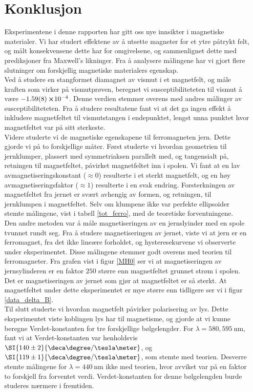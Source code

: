 \documentclass[%
 reprint,
nofootinbib,
aps,
]{revtex4-1}
\begin{document}
\section{Konklusjon}
Eksperimentene i denne rapporten har gitt oss nye innsikter i magnetiske materialer. Vi har studert effektene av å utsette magneter for et ytre påtrykt felt, og målt konsekvensene dette har for omgivelsene, og sammenlignet dette med prediksjoner fra Maxwell's likninger. Fra å analysere målingene har vi gjort flere slutninger om forskjellig magnetiske materialers egenskap.\\
Ved å studere en stangformet diamagnet av vismut i et magnetfelt, og måle kraften som virker på vismutprøven, beregnet vi susceptibiliteteten til vismut å være $-\SI{1.59\pm0.08}\cross 10^{-4}$. Denne verdien stemmer overens med andres målinger av susceptibiliteteten. Fra å studere resultatene fant vi at det ga ingen effekt å inkludere magnetfeltet til vismutstangen i endepunktet, lengst unna punktet hvor magnetfeltet var på sitt sterkeste.\\
Videre studerte vi de magnetiske egenskapene til ferromagneten jern. Dette gjorde vi på to forskjellige måter. Først studerte vi hvordan geometrien til jernklumper, plassert med symmetriaksen parallelt med, og tangensialt på, retningen til magnetfeltet, påvirket magnetfeltet inn i spolen. Vi fant at en lav avmagnetiseringskonstant ($\approx 0$) resulterte i et sterkt magnetfelt, og en høy avmagnetiseringsfaktor ($\approx 1$) resulterte i en svak endring. Forsterkningen av magnetfeltet fra jernet er svært avhengig av formen, og retningen, til jernklumpen i magnetfeltet. Selv om klumpene ikke var perfekte ellipsoider stemte målingene, vist i tabell \vref{tot_ferro}, med de teoretiske forventningene.\\
Den andre metoden var å måle magnetiseringen av en jernslyinder med en spole tvunnet rundt seg. Fra å studere magnetiseringen av jernet, viste vi at jern er en ferromagnet, fra det ikke lineære forholdet, og hysteresekurvene vi observerte under eksperimentet. Disse målingene stemmer godt overens med teorien til ferromagneter. Fra grafen vist i figur \vref{MH0} ser vi at magnetiseringen av jernsylinderen er en faktor $250$ større enn magnetfeltet grunnet strøm i spolen. Det er magnetiseringen av jernet som gjør at magnetfeltet er så sterkt. At magnetfeltet under dette eksperimentet er mye større enn tidligere ser vi i figur \vref{data_delta_B}. \\
Til slutt studerte vi hvordan magnetfelt påvirker polarisering av lys. Dette eksperimentet viste koblingen lys har til magnetisme, og gjorde at vi kunne beregne Verdet-konstanten for tre forskjellige bølgelengder. For $\lambda = 580, \SI{595}{\nano\meter}$, fant vi at Verdet-konstanten var henholdsvis $\SI{140\pm2}{\deca\degree/\tesla\meter}$, og $\SI{119\pm1}{\deca\degree/\tesla\meter}$, som stemte med teorien. Desverre stemte målingene for $\lambda=\SI{440}{\nano\meter}$ ikke med teorien, hvor avviket var på en faktor to forskjell fra forventet verdi. Verdet-konstanten for denne bølgelengden burde studeres nærmere i fremtiden.
{}

\end{document}
